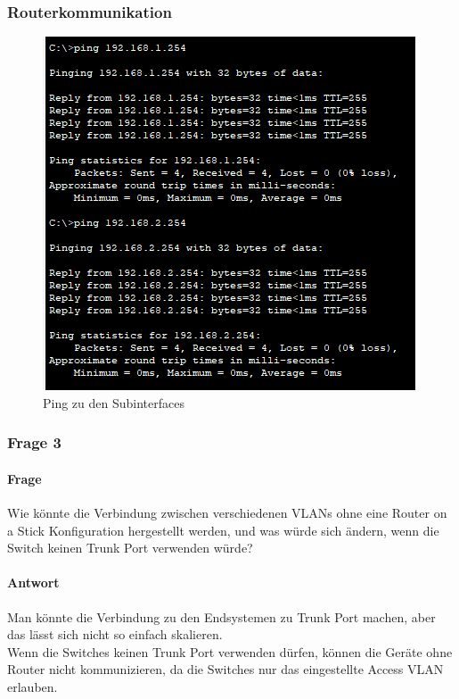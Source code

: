 \subsubsection{Routerkommunikation}
\begin{figure}[!htb]
    \includegraphics[width=\textwidth,height=\textwidth,keepaspectratio]{./img/ping_router.png}
    \caption{Ping zu den Subinterfaces}
\end{figure}
\pagebreak
\subsubsection{Frage 3}
\paragraph{Frage}
Wie könnte die Verbindung zwischen verschiedenen VLANs ohne eine
Router on a Stick Konfiguration hergestellt werden, und was würde sich ändern,
wenn die Switch keinen Trunk Port verwenden würde?
\paragraph{Antwort}
Man könnte die Verbindung zu den Endsystemen zu Trunk Port machen, aber das lässt sich nicht so einfach skalieren.\\
Wenn die Switches keinen Trunk Port verwenden dürfen, können die Geräte ohne Router nicht kommunizieren, da die Switches nur das eingestellte Access VLAN erlauben.